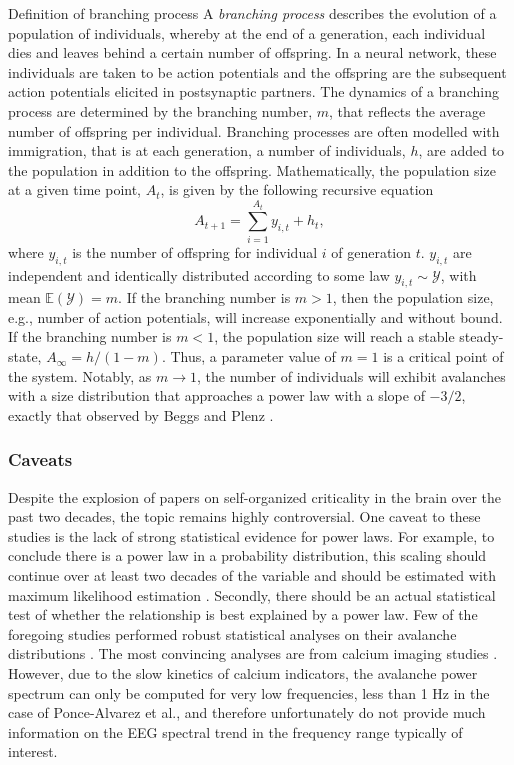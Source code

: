 \begin{mybox}[floatplacement=t,label={box:first}]{Definition of branching process}
   A \textit{branching process} describes the evolution of a population of individuals, whereby at the end of a generation, each individual dies and leaves behind a certain number of offspring. In a neural network, these individuals are taken to be action potentials and the offspring are the subsequent action potentials elicited in postsynaptic partners. The dynamics of a branching process are determined by the branching number, $m$, that reflects the average number of offspring per individual. Branching processes are often modelled with immigration, that is at each generation, a number of individuals, $h$, are added to the population in addition to the offspring. Mathematically, the population size at a given time point, $A_t$, is given by the following recursive equation \cite{Wilting2018}
    \begin{equation}
        A_{t+1} = \sum_{i=1}^{A_{t}} y_{i,t} + h_t\mathrm{,}
    \end{equation}
    where $y_{i,t}$ is the number of offspring for individual $i$ of generation $t$.  $y_{i,t}$ are independent and identically distributed according to some law $y_{i,t}\sim\mathcal{Y}$, with mean $\mathbb{E}(\mathcal{Y})=m$. If the branching number is $m>1$, then the population size, e.g., number of action potentials, will increase exponentially and without bound. If the branching number is $m<1$, the population size will reach a stable steady-state, $A_{\infty}=h/(1-m)$. Thus, a parameter value of $m=1$ is a critical point of the system. Notably, as $m\to1$, the number of individuals will exhibit avalanches with a size distribution that approaches a power law with a slope of $-3/2$, exactly that observed by Beggs and Plenz \cite{Beggs2003}.
\end{mybox}


\subsubsection{Caveats}

Despite the explosion of papers on self-organized criticality in the brain over the past two decades, the topic remains highly controversial. One caveat to these studies is the lack of strong statistical evidence for power laws. For example, to conclude there is a power law in a probability distribution, this scaling should continue over at least two decades of the variable and should be estimated with maximum likelihood estimation \cite{Stumpf2012}. Secondly, there should be an actual statistical test of whether the relationship is best explained by a power law. Few of the foregoing studies performed robust statistical analyses on their avalanche distributions \cite{Clauset2009}. The most convincing analyses are from calcium imaging studies \cite{Bellay2015, Ponce-Alvarez2018}. However, due to the slow kinetics of calcium indicators, the avalanche power spectrum can only be computed for very low frequencies, less than 1 Hz in the case of Ponce-Alvarez et al.\cite{Ponce-Alvarez2018}, and therefore unfortunately do not provide much information on the EEG spectral trend in the frequency range typically of interest.

